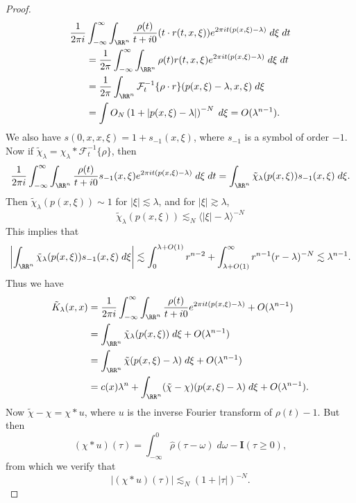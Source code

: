 \begin{proof}
    \begin{align*}
        \frac{1}{2 \pi i} &\int_{-\infty}^\infty \int_{\RR^n} \frac{\rho(t)}{t + i0} (t \cdot r(t,x,\xi)) e^{2 \pi i t(p(x,\xi) - \lambda)}\; d\xi\; dt\\
        &= \frac{1}{2 \pi} \int_{-\infty}^\infty \int_{\RR^n} \rho(t) r(t,x,\xi) e^{2 \pi i t(p(x,\xi) - \lambda)}\; d\xi\; dt\\
        &= \frac{1}{2 \pi} \int_{\RR^n} \mathcal{F}^{-1}_t \{ \rho \cdot r \}( p(x,\xi) - \lambda ,x,\xi)\; d\xi\\
        &= \int O_N \left( 1 + |p(x,\xi) - \lambda| \right)^{-N}\; d\xi = O(\lambda^{n-1}).
    \end{align*}
    We also have $s(0,x,x,\xi) = 1 + s_{-1}(x,\xi)$, where $s_{-1}$ is a symbol of order $-1$. Now if $\tilde{\chi}_\lambda = \chi_\lambda * \mathcal{F}_t^{-1} \{ \rho \}$, then
    \[ \frac{1}{2 \pi i} \int_{-\infty}^\infty \int_{\RR^n} \frac{\rho(t)}{t + i0} s_{-1}(x,\xi) e^{2 \pi i t (p(x,\xi) - \lambda)}\; d\xi\; dt = \int_{\RR^n} \tilde{\chi}_\lambda(p(x,\xi)) s_{-1}(x,\xi)\; d\xi. \]
    Then $\tilde{\chi}_\lambda(p(x,\xi)) \sim 1$ for $|\xi| \lesssim \lambda$, and for $|\xi| \gtrsim \lambda$,
    \[ \tilde{\chi}_\lambda(p(x,\xi)) \lesssim_N \langle |\xi| - \lambda \rangle^{-N} \]
    This implies that
    \[ \left| \int_{\RR^n} \tilde{\chi}_\lambda(p(x,\xi)) s_{-1}(x,\xi)\; d\xi \right| \lesssim \int_0^{\lambda + O(1)} r^{n-2} + \int_{\lambda + O(1)}^\infty r^{n-1} (r - \lambda)^{-N} \lesssim \lambda^{n-1}. \]
    Thus we have
    \begin{align*}
        \tilde{K}_\lambda(x,x) &= \frac{1}{2 \pi i} \int_{-\infty}^\infty \int_{\RR^n} \frac{\rho(t)}{t + i0} e^{2 \pi i t (p(x,\xi) - \lambda)} + O(\lambda^{n-1})\\
        &= \int_{\RR^n} \tilde{\chi}_\lambda(p(x,\xi))\; d\xi + O(\lambda^{n-1})\\
        &= \int_{\RR^n} \tilde{\chi}(p(x,\xi) - \lambda)\; d\xi + O(\lambda^{n-1})\\
        &= c(x) \lambda^n + \int_{\RR^n} (\tilde{\chi} - \chi)(p(x,\xi) - \lambda)\; d\xi + O(\lambda^{n-1}).
    \end{align*}
    Now $\tilde{\chi} - \chi = \chi * u$, where $u$ is the inverse Fourier transform of $\rho(t) - 1$. But then
    \[ (\chi * u)(\tau) = \int_{-\infty}^0 \widehat{\rho}(\tau - \omega)\; d\omega - \mathbf{I}(\tau \geq 0), \]
    from which we verify that
    \[ |(\chi * u)(\tau)| \lesssim_N (1 + |\tau|)^{-N}. \]

\end{proof}
